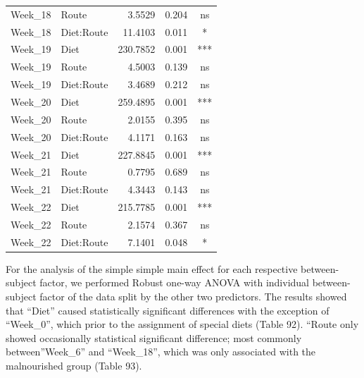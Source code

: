 \documentclass[
  12pt,
  letterpaper,
]{article}
\begin{document}
\begin{longtable}{l|lrrc}
Week\_18 & Route & 3.5529 & 0.204 & ns \\ 
Week\_18 & Diet:Route & 11.4103 & 0.011 & * \\ 
Week\_19 & Diet & 230.7852 & 0.001 & *** \\ 
Week\_19 & Route & 4.5003 & 0.139 & ns \\ 
Week\_19 & Diet:Route & 3.4689 & 0.212 & ns \\ 
Week\_20 & Diet & 259.4895 & 0.001 & *** \\ 
Week\_20 & Route & 2.0155 & 0.395 & ns \\ 
Week\_20 & Diet:Route & 4.1171 & 0.163 & ns \\ 
Week\_21 & Diet & 227.8845 & 0.001 & *** \\ 
Week\_21 & Route & 0.7795 & 0.689 & ns \\ 
Week\_21 & Diet:Route & 4.3443 & 0.143 & ns \\ 
Week\_22 & Diet & 215.7785 & 0.001 & *** \\ 
Week\_22 & Route & 2.1574 & 0.367 & ns \\ 
Week\_22 & Diet:Route & 7.1401 & 0.048 & * \\ 
\bottomrule
\end{longtable}

For the analysis of the simple simple main effect for each respective between-subject factor, we performed Robust one-way ANOVA with individual between-subject factor of the data split by the other two predictors. The results showed that ``Diet'' caused statistically significant differences with the exception of ``Week\_0'', which prior to the assignment of special diets (Table 92). ``Route only showed occasionally statistical significant difference; most commonly between''Week\_6'' and ``Week\_18'', which was only associated with the malnourished group (Table 93).
\end{document}
